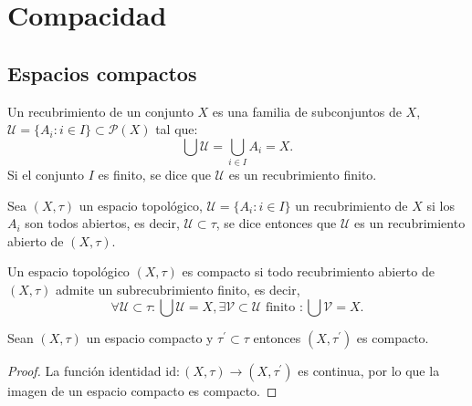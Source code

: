 \section{Compacidad}

\subsection{Espacios compactos}

\begin{definición}[Recubrimiento]
    Un recubrimiento de un conjunto $X$ es una familia de subconjuntos de $X$, $\mathcal{U} = \{A_i : i \in I\} \subset \mathcal{P}(X)$ tal que:
    $$\bigcup \mathcal{U} = \bigcup_{i \in I} A_i = X.$$
    Si el conjunto $I$ es finito, se dice que $\mathcal{U}$ es un recubrimiento finito.
\end{definición}
\begin{definición}
    Sea $(X, \tau)$ un espacio topológico, $\mathcal{U} = \{A_i : i \in I\}$ un recubrimiento de $X$ si los $A_i$ son todos abiertos, es decir, $\mathcal{U} \subset \tau$, se dice entonces que $\mathcal{U}$ es un recubrimiento abierto de $(X, \tau)$.
\end{definición}
\begin{definición}[Compacto]
    Un espacio topológico $(X, \tau)$ es compacto si todo recubrimiento abierto de $(X, \tau)$ admite un subrecubrimiento finito, es decir, 
    $$\forall \mathcal{U} \subset \tau : \bigcup \mathcal{U} = X, \exists \mathcal{V} \subset \mathcal{U} \text{ finito } : \bigcup \mathcal{V} = X.$$   
\end{definición}
\begin{proposición}
    Sean $(X, \tau)$ un espacio compacto y $\tau^{\prime} \subset \tau$ entonces $(X, \tau^{\prime})$ es compacto.
\end{proposición}
\begin{proof}
    La función identidad $\mathrm{id} : (X, \tau) \to (X, \tau^{\prime})$ es continua, por lo que la imagen de un espacio compacto es compacto.
\end{proof}
